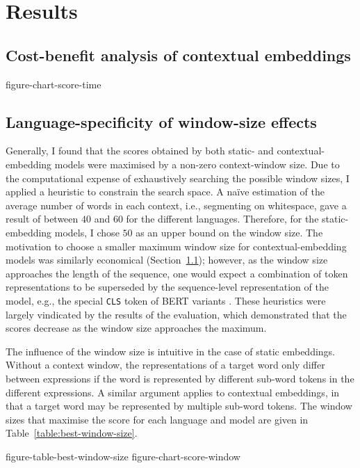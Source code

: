 \section{Results}

\subsection{Cost-benefit analysis of contextual embeddings}
\label{sec:cost-benefit}

{figure-chart-score-time}

\subsection{Language-specificity of window-size effects}

Generally, I found that the scores obtained by both static- and contextual-embedding
models were maximised by a non-zero context-window size.
Due to the computational expense of exhaustively searching the possible window sizes,
I applied a heuristic to constrain the search space.
A naïve estimation of the average number of words in each context, i.e., segmenting on
whitespace, gave a result of between $40$ and $60$ for the different languages.
Therefore, for the static-embedding models, I chose $50$ as an upper bound on the
window size.
The motivation to choose a smaller maximum window size for contextual-embedding models
was similarly economical (Section~\ref{sec:cost-benefit}); however, as the window size
approaches the length of the sequence, one would expect a combination of token
representations to be superseded by the sequence-level representation of the model,
e.g., the special \texttt{CLS} token of BERT variants \parencite[4174]{Devlin2019}.
These heuristics were largely vindicated by the results of the evaluation, which
demonstrated that the scores decrease as the window size approaches the maximum.

The influence of the window size is intuitive in the case of static embeddings.
Without a context window, the representations of a target word only differ between
expressions if the word is represented by different sub-word tokens in the different
expressions.
A similar argument applies to contextual embeddings, in that a target word may be
represented by multiple sub-word tokens.
The window sizes that maximise the score for each language and model are given in
Table~\ref{table:best-window-size}.

{figure-table-best-window-size}
{figure-chart-score-window}


